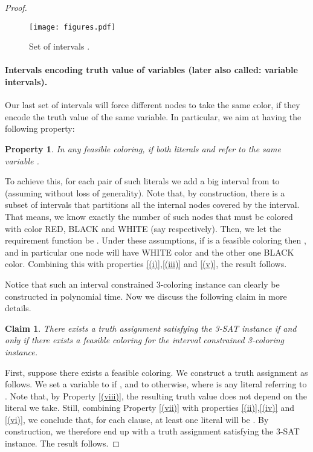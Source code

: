 \documentclass[a4paper,11pt]{article}
\theoremstyle{theorem}
\newtheorem{claim}[theorem]{Claim}
\newtheorem{property}[theorem]{Property}
\begin{document}
\begin{proof}
\begin{figure}[htb]
\centering
\texttt{[image: figures.pdf]} 
\caption{Set of intervals .}
\label{fig:5}
\end{figure}


\paragraph{Intervals encoding truth value of variables (later also called: variable intervals).} Our last set of intervals will force different nodes to take the same color, if they encode the truth value of the same variable. In particular, we aim at having the following property:

\begin{property}\label{(viii)}
In any feasible coloring,  if both literals  and  refer to the same variable .
\end{property}

\noindent To achieve this, for each pair of such literals we add a big interval  from  to  (assuming  without loss of generality). Note that, by construction, there is a subset of intervals that partitions all the internal nodes covered by the interval. That means, we know exactly the number of such nodes that must be colored with color RED, BLACK and WHITE (say  respectively). Then, we let the requirement function be . Under these assumptions, if  is a feasible coloring then  , and in particular one node will have WHITE color and the other one BLACK color. Combining this with properties \eqref{(i)},\eqref{(iii)} and \eqref{(v)}, the result follows.


\medskip
Notice that such an interval constrained 3-coloring instance can clearly be constructed in polynomial time. Now we discuss the following claim in more details.

\begin{claim}
There exists a truth assignment satisfying the 3-SAT instance if and only if there exists a feasible coloring  for the interval constrained 3-coloring instance.
\end{claim}

First, suppose there exists a feasible coloring. We construct a truth assignment as follows. We set a variable  to  if , and to  otherwise, where  is any literal referring to . 
Note that, by Property  \eqref{(viii)}, the resulting truth value does not depend on the literal we take. 
Still, combining Property \eqref{(vii)} with properties \eqref{(ii)},\eqref{(iv)} and \eqref{(vi)}, we conclude that, for each clause, at least one literal will be . By construction, we therefore end up with a truth assignment satisfying the 3-SAT instance. The result follows.


\end{proof}
\end{document}
